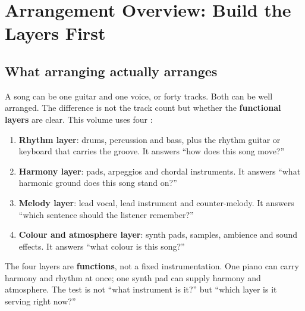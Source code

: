 \chapter{Arrangement Overview: Build the Layers First}
\label{ch:overview}


\section{What arranging actually arranges}
\label{sec:what-is-arrangement}

A song can be one guitar and one voice, or forty tracks. Both can be well arranged. The difference is not the track count but whether the \textbf{functional layers} are clear. This volume uses four :

\begin{enumerate}
\item \textbf{Rhythm layer}: drums, percussion and bass, plus the rhythm guitar or keyboard that carries the groove. It answers ``how does this song move?''
\item \textbf{Harmony layer}: pads, arpeggios and chordal instruments. It answers ``what harmonic ground does this song stand on?''
\item \textbf{Melody layer}: lead vocal, lead instrument and counter-melody. It answers ``which sentence should the listener remember?''
\item \textbf{Colour and atmosphere layer}: synth pads, samples, ambience and sound effects. It answers ``what colour is this song?''
\end{enumerate}

The four layers are \textbf{functions}, not a fixed instrumentation. One piano can carry harmony and rhythm at once; one synth pad can supply harmony and atmosphere. The test is not ``what instrument is it?'' but ``which layer is it serving right now?''

